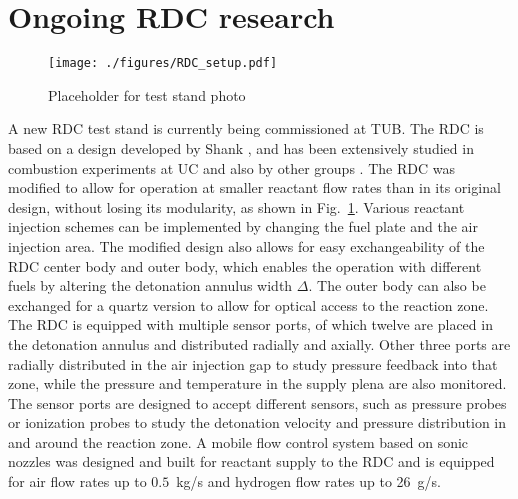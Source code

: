 \documentclass[]{aiaa-tc}%
\begin{document}
\section{Ongoing RDC research}
\begin{figure}[ht]
\noindent\begin{minipage}[c]{0.48\textwidth}%
		\texttt{[image: ./figures/RDC\_setup.pdf]}
		\label{fig:exp_setup}
\end{minipage}\hfill
\begin{minipage}[c]{0.48\textwidth}%
		\centering
		Placeholder for test stand photo
\end{minipage}
\end{figure}



A new RDC test stand is currently being commissioned at TUB. The RDC is based on a design developed by Shank \cite{Shank2012}, and has been extensively studied in combustion experiments at UC and also by other groups \cite{Naples2013, Paxson2015, Anand2016, St.George2015a, Driscoll2015, Pandiya2016}. The RDC was modified to allow for operation at smaller reactant flow rates than in its original design, without losing its modularity, as shown in Fig.~\ref{fig:exp_setup}. Various reactant injection schemes can be implemented by changing the fuel plate and the air injection area. The modified design also allows for easy exchangeability of the RDC center body and outer body, which enables the operation with different fuels by altering the detonation annulus width $\Delta$. The outer body can also be exchanged for a quartz version to allow for optical access to the reaction zone. The RDC is equipped with multiple sensor ports, of which twelve are placed in the detonation annulus and distributed radially and axially. Other three ports are radially distributed in the air injection gap to study pressure feedback into that zone, while the pressure and temperature in the supply plena are also monitored. The sensor ports are designed to accept different sensors, such as pressure probes or ionization probes to study the detonation velocity and pressure distribution in and around the reaction zone. A mobile flow control system based on sonic nozzles was designed and built for reactant supply to the RDC and is equipped for air flow rates up to $0.5$~kg/s and hydrogen flow rates up to 26~g/s.
\end{document}
